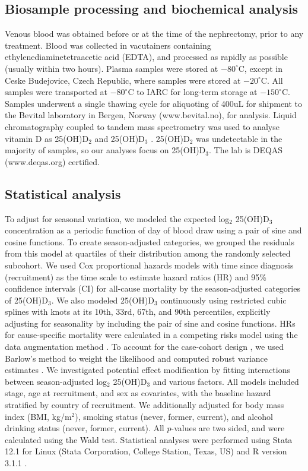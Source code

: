 \documentclass[a4paper,11pt]{article}
\renewcommand{\cite}{\citep}
\begin{document}
\subsection*{Biosample processing and biochemical analysis}
Venous blood was obtained before or at the time of the nephrectomy, prior to 
any treatment. Blood was collected in vacutainers containing 
ethylenediaminetetraacetic acid (EDTA), and processed as rapidly as possible 
(usually within two hours). Plasma samples were stored at $-80^{\circ}$C, 
except in Ceske Budejovice, Czech Republic, where samples were stored at 
$-20^{\circ}$C. All samples were transported at $-80^{\circ}$C to IARC for 
long-term storage at $-150^{\circ}$C. Samples underwent a single thawing cycle 
for aliquoting of 400uL for shipment to the Bevital laboratory in Bergen, 
Norway (www.bevital.no), for analysis. Liquid chromatography coupled to tandem 
mass spectrometry was used to analyse vitamin D as 25(OH)D$_2$ and 
25(OH)D$_3$ \cite{midttun_determination_2011}. 25(OH)D$_2$ was undetectable in 
the majority of samples, so our analyses focus on 25(OH)D$_3$. The lab is DEQAS 
(www.deqas.org) certified.

\subsection*{Statistical analysis}
To adjust for seasonal variation, we modeled the expected log$_2$ 25(OH)D$_3$ 
concentration as a periodic function of day of blood draw using a pair of sine 
and cosine functions. To create season-adjusted categories, we grouped the 
residuals from this model at quartiles of their distribution among the randomly 
selected subcohort. We used Cox proportional hazards models with time since 
diagnosis (recruitment) as the time scale to estimate hazard ratios (HR) and 
95\% confidence intervals (CI) for all-cause mortality by the season-adjusted 
categories of 25(OH)D$_3$. We also modeled 25(OH)D$_3$ continuously using 
restricted cubic splines with knots at its 10th, 33rd, 67th, and 90th 
percentiles, explicitly adjusting for seasonality by including the pair of sine 
and cosine functions. HRs for cause-specific mortality were calculated in a 
competing risks model using the data augmentation method 
\cite{lunn_applying_1995}. To account for the case-cohort design 
\cite{prentice_case-cohort_1986}, we used Barlow's method to weight the 
likelihood and computed robust variance estimates \cite{barlow_robust_1994, 
barlow_analysis_1999}. We investigated potential effect modification by fitting 
interactions between season-adjusted log$_2$ 25(OH)D$_3$ and various factors. 
All models included stage, age at recruitment, and sex as covariates, with the 
baseline hazard stratified by country of recruitment. We additionally adjusted 
for body mass index (BMI, kg/m$^2$), smoking status (never, former, current), 
and alcohol drinking status (never, former, current).
All $p$-values are two sided, and were calculated using the Wald test. 
Statistical analyses were performed using Stata 12.1 for Linux (Stata 
Corporation, College Station, Texas, US) and R version 3.1.1 \cite{r_2014}.
\end{document}
